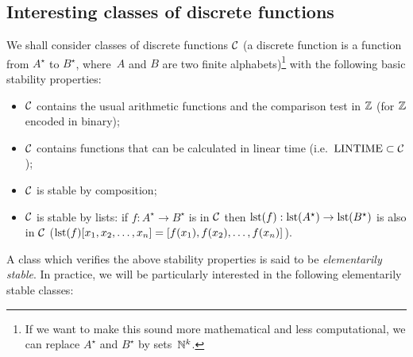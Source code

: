 \subsection{Interesting classes of discrete functions}\label{subsec12} 

We shall consider classes of discrete functions ${{\cal C}}$ (a discrete function is a function from $A^{\star}$ to $B^{\star}$, where~$A$ and $B$ are two finite alphabets)\footnote{If we want to make this sound more mathematical and less computational, we can replace $A^{\star}$ and $B^{\star}$ by sets~$\mathbb {N}^k$.} with the following basic stability properties:
\begin{itemize}

\item 
 
${{\cal C}}$ contains the usual arithmetic functions and the comparison test in $\mathbb {Z}$ (for $\mathbb {Z}$ encoded in binary);

\item 
${{\cal C}}$ contains functions that can be calculated in linear time (i.e.\ ${\rm LINTIME} \subset {{\cal C}}$);

\item 
${{\cal C}}$ is stable by composition;

\item 
${{\cal C}}$ is stable by lists: if $f:A^{\star} \to B^{\star}$ is in ${{\cal C}}$ then ${\rm lst}(f): {\rm lst}(A^{\star}) \to {\rm lst}(B^{\star})$ is also in ${{\cal C}}$ (${\rm lst}(f)[x_1, x_2,\ldots, x_n] = [f(x_1), f(x_2),\ldots, f(x_n)]$).
\end{itemize}
A class which verifies the above stability properties is said to be \emph{elementarily stable}.
In practice, we will be particularly interested in the following elementarily stable classes:
